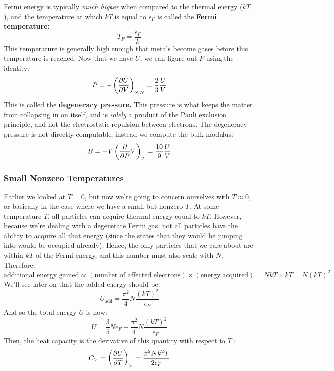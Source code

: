 \documentclass[10pt]{article}
\begin{document}
	Fermi energy is typically \textit{much higher} when compared to the thermal energy (\( kT \) ), and the temperature 
	at which \( kT \) is equal to  \( \epsilon_F \) is called the \textbf{Fermi temperature:}
	\[
	T_F = \frac{\epsilon_F}{k}
	\] 
	This temperature is generally high enough that metals become gases before this temperature is reached. Now that we have 
	\( U \), we can figure out \( P \) using the identity: 
	\[
		P = -\left( \pdv{U}{V} \right)_{S, N} = \frac{2}{3}\frac{U}{V}
	\] 
	This is called the \textbf{degeneracy pressure.} This pressure is what keeps the matter from collapsing in on itself, 
	and is \textit{solely} a product of the Pauli exclusion principle, and not the electrostatic repulsion between electrons. The 
	degeneracy pressure is not directly computable, instead we compute the bulk modulus:
	\[
	B = -V\left( \pdv PV \right) _T = \frac{10}{9} \frac{U}{V}
	\] 

	\subsubsection{Small Nonzero Temperatures}
	Earlier we looked at \( T = 0 \), but now we're going to concern ourselves with \( T \approx 0 \), or basically 
	in the case where we have a small but nonzero \( T \). At some temperature \( T \), all particles can acquire thermal 
	energy equal to \( kT \). However, because we're dealing with a degenerate Fermi gas, not all particles have the ability to 
	acquire all that energy (since the states that they would be jumping into would be occupied already). Hence, 
	the only particles that we care about are within \( kT \) of the Fermi energy, and this number must also scale with \( N \). 
	Therefore: 
	\[
	\text{additional energy gained} \propto (\text{number of affected electrons}) \times (\text{energy acquired}) = NkT
	\times kT = N(kT)^2
	\] 
	We'll see later on that the added energy should be:
	\[
	U_{\text{add}} = \frac{\pi^2}{4} N \frac{(kT)^2}{\epsilon_F}
	\] 
	And so the total energy \( U \) is now:
	\[
	U = \frac{3}{5}N \epsilon_F + \frac{\pi^2}{4}N \frac{(kT)^2}{\epsilon_F}
	\] 
	Then, the heat capacity is the derivative of this quantity with respect to \( T \) :
	\[
		C_V = \left( \pdv{U}{T} \right)_V = \frac{\pi^2 Nk^2 T}{2\epsilon_F}
	\]  
\end{document}
